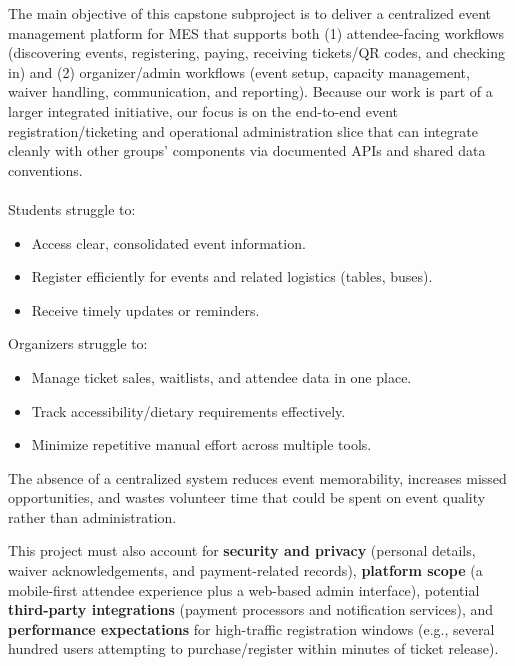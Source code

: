 \documentclass{article}
\begin{document}
\noindent The main objective of this capstone subproject is to deliver a centralized event management platform for MES
that supports both (1) attendee-facing workflows (discovering events, registering, paying, receiving
tickets/QR codes, and checking in) and (2) organizer/admin workflows (event setup, capacity management,
waiver handling, communication, and reporting). Because our work is part of a larger integrated initiative, 
our focus is on the end-to-end event registration/ticketing and operational administration slice that
can integrate cleanly with other groups' components via documented APIs and shared data conventions.
\\
\\Students struggle to:
\begin{itemize}
    \item Access clear, consolidated event information.
    \item Register efficiently for events and related logistics (tables, buses).
    \item Receive timely updates or reminders.
\end{itemize}
Organizers struggle to:
\begin{itemize}
    \item Manage ticket sales, waitlists, and attendee data in one place.
    \item Track accessibility/dietary requirements effectively.
    \item Minimize repetitive manual effort across multiple tools.
\end{itemize}
The absence of a centralized system reduces event memorability, increases missed opportunities, and 
wastes volunteer time that could be spent on event quality rather than administration.

This project must also account for \textbf{security and privacy} (personal details, waiver acknowledgements, and payment-related records), \textbf{platform scope} (a mobile-first attendee experience plus a web-based admin interface), potential \textbf{third-party integrations} (payment processors and notification services), and \textbf{performance expectations} for high-traffic registration windows (e.g., several hundred users attempting to purchase/register within minutes of ticket release).
\end{document}
